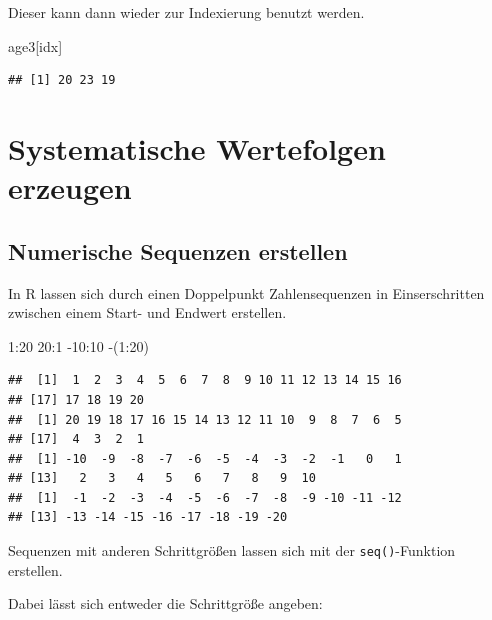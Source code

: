 \documentclass[
]{book}
\newenvironment{Shaded}{\begin{snugshade}}{\end{snugshade}}
\newcommand{\DecValTok}[1]{\textcolor[rgb]{0.00,0.00,0.81}{#1}}
\newcommand{\NormalTok}[1]{#1}
\newcommand{\SpecialCharTok}[1]{\textcolor[rgb]{0.00,0.00,0.00}{#1}}
\begin{document}
Dieser kann dann wieder zur Indexierung benutzt werden.

\begin{Shaded}
\begin{Highlighting}[]
\NormalTok{age3[idx]}
\end{Highlighting}
\end{Shaded}

\begin{verbatim}
## [1] 20 23 19
\end{verbatim}

\hypertarget{systematische-wertefolgen-erzeugen}{%
\section{Systematische Wertefolgen erzeugen}\label{systematische-wertefolgen-erzeugen}}

\hypertarget{numerische-sequenzen-erstellen}{%
\subsection{Numerische Sequenzen erstellen}\label{numerische-sequenzen-erstellen}}

\small

In R lassen sich durch einen Doppelpunkt Zahlensequenzen in Einserschritten zwischen einem Start- und Endwert erstellen.

\begin{Shaded}
\begin{Highlighting}[]
\DecValTok{1}\SpecialCharTok{:}\DecValTok{20} 
\DecValTok{20}\SpecialCharTok{:}\DecValTok{1}
\SpecialCharTok{{-}}\DecValTok{10}\SpecialCharTok{:}\DecValTok{10}
\SpecialCharTok{{-}}\NormalTok{(}\DecValTok{1}\SpecialCharTok{:}\DecValTok{20}\NormalTok{)}
\end{Highlighting}
\end{Shaded}

\begin{verbatim}
##  [1]  1  2  3  4  5  6  7  8  9 10 11 12 13 14 15 16
## [17] 17 18 19 20
##  [1] 20 19 18 17 16 15 14 13 12 11 10  9  8  7  6  5
## [17]  4  3  2  1
##  [1] -10  -9  -8  -7  -6  -5  -4  -3  -2  -1   0   1
## [13]   2   3   4   5   6   7   8   9  10
##  [1]  -1  -2  -3  -4  -5  -6  -7  -8  -9 -10 -11 -12
## [13] -13 -14 -15 -16 -17 -18 -19 -20
\end{verbatim}

Sequenzen mit anderen Schrittgrößen lassen sich mit der \texttt{seq()}-Funktion erstellen.

Dabei lässt sich entweder die Schrittgröße angeben:
\end{document}
